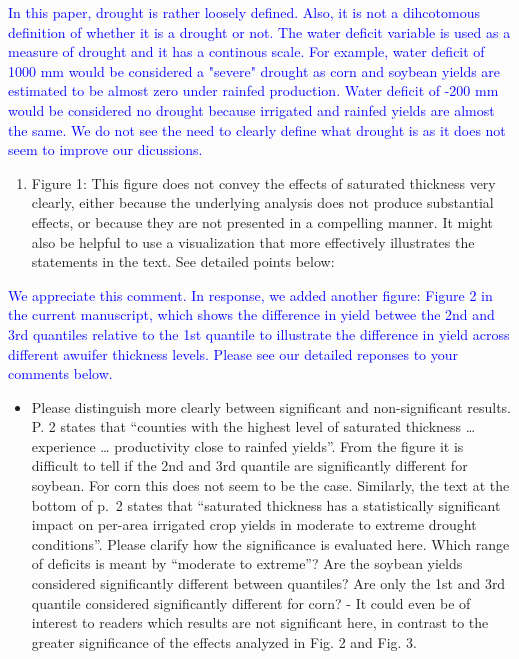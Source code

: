\documentclass[
]{article}
\providecommand{\tightlist}{%
  \setlength{\itemsep}{0pt}\setlength{\parskip}{0pt}}
\begin{document}
\textcolor{blue}{In this paper, drought is rather loosely defined. Also, it is not a dihcotomous definition of whether it is a drought or not. The water deficit variable is used as a measure of drought and it has a continous scale. For example, water deficit of 1000 mm would be considered a "severe" drought as corn and soybean yields are estimated to be almost zero under rainfed production. Water deficit of -200 mm would be considered no drought because irrigated and rainfed yields are almost the same. We do not see the need to clearly define what drought is as it does not seem to improve our dicussions.}

\begin{enumerate}
\def\labelenumi{\arabic{enumi}.}
\setcounter{enumi}{1}
\tightlist
\item
  Figure 1: This figure does not convey the effects of saturated
  thickness very clearly, either because the underlying analysis does
  not produce substantial effects, or because they are not presented in
  a compelling manner. It might also be helpful to use a visualization
  that more effectively illustrates the statements in the text. See
  detailed points below:
\end{enumerate}

\textcolor{blue}{We appreciate this comment. In response, we added another figure: Figure 2 in the current manuscript, which shows the difference in yield betwee the 2nd and 3rd quantiles relative to the 1st quantile to illustrate the difference in yield across different awuifer thickness levels. Please see our detailed reponses to your comments below.}

\begin{itemize}
\tightlist
\item
  Please distinguish more clearly between significant and
  non-significant results. P. 2 states that ``counties with the highest
  level of saturated thickness \ldots{} experience \ldots{} productivity
  close to rainfed yields''. From the figure it is difficult to tell if
  the 2nd and 3rd quantile are significantly different for soybean. For
  corn this does not seem to be the case. Similarly, the text at the
  bottom of p.~2 states that ``saturated thickness has a statistically
  significant impact on per-area irrigated crop yields in moderate to
  extreme drought conditions''. Please clarify how the significance is
  evaluated here. Which range of deficits is meant by ``moderate to
  extreme''? Are the soybean yields considered significantly different
  between quantiles? Are only the 1st and 3rd quantile considered
  significantly different for corn? - It could even be of interest to
  readers which results are not significant here, in contrast to the
  greater significance of the effects analyzed in Fig. 2 and Fig. 3.
\end{itemize}
\end{document}
